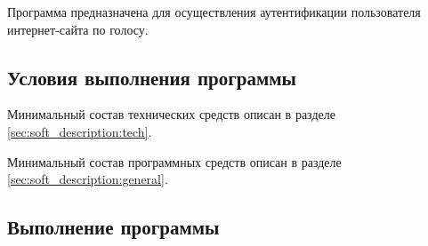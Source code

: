 Программа предназначена для осуществления аутентификации пользователя
интернет-сайта по голосу.

\subsection{Условия выполнения программы}

Минимальный состав технических средств описан в разделе \ref{sec:soft_description:tech}.

Минимальный состав программных средств описан в разделе \ref{sec:soft_description:general}.

\subsection{Выполнение программы}



